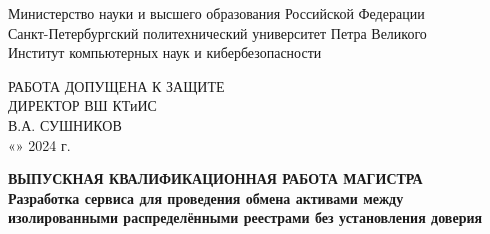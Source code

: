\begin{titlepage}
\begin{center} %


Министерство науки и высшего образования Российской Федерации\\
Санкт-Петербургский политехнический университет Петра Великого\\
Институт компьютерных наук и кибербезопасности\\
[1.2cm]

\begin{flushleft}
    \hspace{8.5cm}РАБОТА ДОПУЩЕНА К ЗАЩИТЕ\\
    \hspace{8.5cm}ДИРЕКТОР ВШ КТиИС\\
    \hspace{8.5cm}\underline{\hspace{3.5cm}} В.А. СУШНИКОВ\\
    \hspace{8.5cm}«\underline{\hspace{1.0cm}}»\underline{\hspace{3.5cm}} 2024 г.\\[0.8cm]
\end{flushleft}

{\bfseries ВЫПУСКНАЯ КВАЛИФИКАЦИОННАЯ РАБОТА МАГИСТРА}\\[0.8cm] %
    

{\bfseries Разработка сервиса для проведения обмена активами между\\изолированными распределёнными реестрами без установления доверия}\\[0.5cm] %



\end{center}
\end{titlepage}

